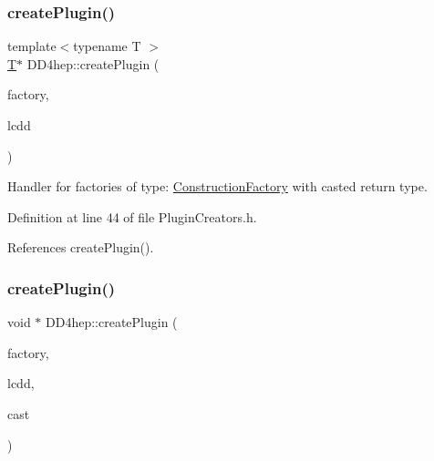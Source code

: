\hypertarget{namespace_d_d4hep_a6e497a042ec61fb7dbe034532619be6b}{}\label{namespace_d_d4hep_a6e497a042ec61fb7dbe034532619be6b} 
\subsubsection{\texorpdfstring{create\+Plugin()}{createPlugin()}\hspace{0.1cm}{\footnotesize\ttfamily [2/6]}}
{\footnotesize\ttfamily template$<$typename T $>$ \\
\hyperlink{class_t}{T}$\ast$ D\+D4hep\+::create\+Plugin (\begin{DoxyParamCaption}\item[{const std\+::string \&}]{factory,  }\item[{\hyperlink{class_d_d4hep_1_1_geometry_1_1_l_c_d_d}{Geometry\+::\+L\+C\+DD} \&}]{lcdd }\end{DoxyParamCaption})}



Handler for factories of type\+: \hyperlink{class_d_d4hep_1_1_construction_factory}{Construction\+Factory} with casted return type. 



Definition at line 44 of file Plugin\+Creators.\+h.



References create\+Plugin().

\hypertarget{namespace_d_d4hep_a65fff585aba587323f89c263548cad90}{}\label{namespace_d_d4hep_a65fff585aba587323f89c263548cad90} 
\subsubsection{\texorpdfstring{create\+Plugin()}{createPlugin()}\hspace{0.1cm}{\footnotesize\ttfamily [3/6]}}
{\footnotesize\ttfamily void $\ast$ D\+D4hep\+::create\+Plugin (\begin{DoxyParamCaption}\item[{const std\+::string \&}]{factory,  }\item[{\hyperlink{class_d_d4hep_1_1_geometry_1_1_l_c_d_d}{Geometry\+::\+L\+C\+DD} \&}]{lcdd,  }\item[{void $\ast$($\ast$)(void $\ast$)}]{cast }\end{DoxyParamCaption})}



